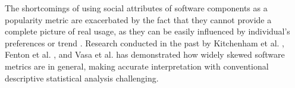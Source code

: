 The shortcomings of using social attributes of software components as a popularity metric are exacerbated by the fact that they cannot provide a complete picture of real usage, as they can be easily influenced by individual's preferences or trend \cite{papamichail2019measuring}. Research conducted in the past by Kitchenham et al. \cite{kitchenham1988evaluation}, Fenton et al. \cite{fenton1999critique}, and Vasa et al. \cite{vasa2007inevitable} has demonstrated how widely skewed software metrics are in general, making accurate interpretation with conventional descriptive statistical analysis challenging.